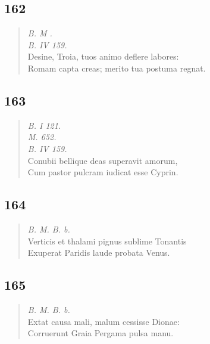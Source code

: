 \documentclass[11pt, a4paper]{report}
\begin{document}
            \subsection*{162}
      \begin{verse}
      \textit{B. M .} \\ \textit{B. IV 159.} \\ Desine, Troia, tuos animo deflere labores: \\ Romam capta creas; merito tua postuma regnat. \\ 
      \end{verse}
  
            \subsection*{163}
      \begin{verse}
      \textit{B. I 121.} \\ \textit{M. 652.} \\ \textit{B. IV 159.} \\ Conubii bellique deas superavit amorum, \\ Cum pastor pulcram iudicat esse Cyprin. \\ 
      \end{verse}
  
            \subsection*{164}
      \begin{verse}
      \textit{B. M. B. b.} \\ Verticis et thalami pignus sublime Tonantis \\ Exuperat Paridis laude probata Venus. \\ 
      \end{verse}
  
            \subsection*{165}
      \begin{verse}
      \textit{B. M. B. b.} \\ Extat causa mali, malum cessisse Dionae: \\ Corruerunt Graia Pergama pulsa manu. \\ 
      \end{verse}
  
\end{document}
